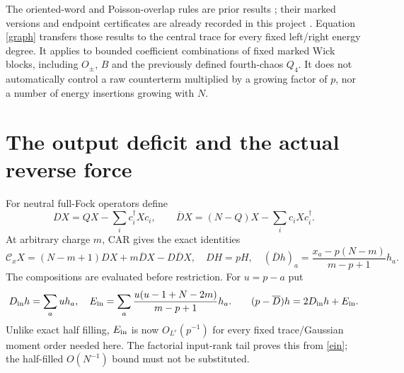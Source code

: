 \documentclass[11pt,a4paper]{article}
\newcommand{\Db}{\overline D}
\begin{document}
The oriented-word and Poisson-overlap rules are prior results
\cite{BNR}; their marked versions and endpoint certificates are
already recorded in this project \cite{oriented}. Equation
\eqref{graph} transfers those results to the central trace for
every fixed left/right energy degree. It applies to bounded
coefficient combinations of fixed marked Wick blocks, including
$O_\pm$, $B$ and the previously defined fourth-chaos $Q_4$.
It does not automatically control a raw counterterm multiplied
by a growing factor of $p$, nor a number of energy insertions
growing with $N$.

\newpage
\section{The output deficit and the actual reverse force}
For neutral full-Fock operators define
\begin{equation}
 DX=QX-\sum_i c_i^\dagger Xc_i,\qquad
 \Db X=(N-Q)X-\sum_i c_iXc_i^\dagger.
\end{equation}
At arbitrary charge $m$, CAR gives the exact identities
\begin{equation}
 \mathcal C_xX=(N-m+1)DX+m\Db X-D\Db X,\quad DH=pH,
 \quad (\Db h)_a=\frac{x_a-p(N-m)}{m-p+1}h_a.\label{casimir}
\end{equation}
The compositions are evaluated before restriction. For $u=p-a$ put
\begin{equation}
 D_{\rm in}h=\sum_a uh_a,\quad
 E_{\rm in}=\sum_a\frac{u(u-1+N-2m)}{m-p+1}h_a.
 \qquad (p-\Db)h=2D_{\rm in}h+E_{\rm in}.\label{ein}
\end{equation}
Unlike exact half filling, $E_{\rm in}$ is now $O_{L^r}(p^{-1})$
for every fixed trace/Gaussian moment order needed here. The
factorial input-rank tail proves this from \eqref{ein}; the half-filled
$O(N^{-1})$ bound must not be substituted.
\end{document}

